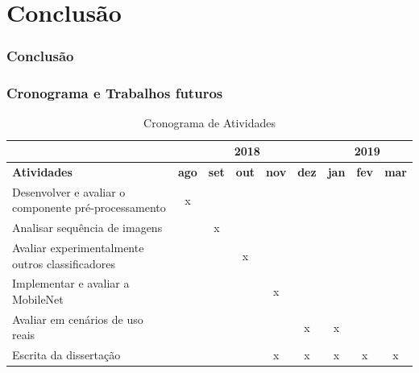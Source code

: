 \documentclass{beamer}
\begin{document}


\section{Conclusão}
\begin{frame}
\frametitle{Conclusão}
\begin{itemize}
\pause

\end{itemize}

\end{frame}


\begin{frame}
 \frametitle{Cronograma e Trabalhos futuros}
 \pause
 \begin{table}\footnotesize
\caption{Cronograma de Atividades}
\label{table:cronog}
\begin{tabular}{l|ccccc|ccc|}
\cline{2-9}
                                                                           & \multicolumn{5}{c|}{\textbf{2018}}                                       & \multicolumn{3}{c|}{\textbf{2019}}         \\ \hline
\multicolumn{1}{|l|}{\textbf{Atividades}}                                  & \textbf{ago} & \textbf{set} & \textbf{out} & \textbf{nov} & \textbf{dez} & \textbf{jan} & \textbf{fev} & \textbf{mar} \\ \hline
\multicolumn{1}{|l|}{Desenvolver e avaliar o componente pré-processamento} & x            &              &              &              &              &              &              &              \\
\multicolumn{1}{|l|}{Analisar sequência de imagens}                        &              & x            &              &              &              &              &              &              \\
\multicolumn{1}{|l|}{Avaliar experimentalmente outros classificadores}     &              &              & x            &              &              &              &              &              \\
\multicolumn{1}{|l|}{Implementar e avaliar a MobileNet}                    &              &              &              & x            &              &              &              &              \\
\multicolumn{1}{|l|}{Avaliar em cenários de uso reais}                     &              &              &              &              & x            & x            &              &              \\
\multicolumn{1}{|l|}{Escrita da dissertação}                                  &              &              &              & x            & x            & x            & x            & x            \\ \hline
\end{tabular}
\end{table}
\end{frame}
\end{document}
